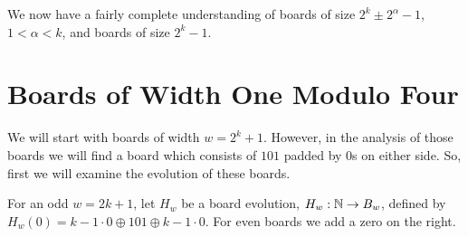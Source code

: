 \documentclass[12pt,letterpaper]{article}
\begin{document}
We now have a fairly complete understanding of boards of size $2^k\pm 2^\alpha-1$, $1<\alpha<k$, and boards of size $2^k-1$. 



\begin{comment}
\begin{proof}
  Suppose there is a gap in the center, the board on an even step is of the form $A\oplus 1\oplus 0\cdot c \oplus 1\oplus A$, where $c\equiv 3\mod 4$, and $c>3$. This last condition is so that it is a true gap, otherwise it is the smallest possible space between living columns, so it would not make sense to call it a gap. We require that there are 1s on either side of the gap, otherwise we could examine a larger gap.
  Furthermore, suppose that $A$ is not all zeros.
  
  Then suppose that after two steps, we have a board with exactly 2 living columns, $a\cdot 0 \oplus 1\oplus c-4\cdot 0\oplus 1\oplus a\cdot 0$. Then consider what the $A$ must have been.
\end{comment}

\section{Boards of Width One Modulo Four}

We will start with boards of width $w=2^k+1$. However, in the analysis of those boards we will find a board which consists of $101$ padded by 0s on either side. So, first we will examine the evolution of these boards.
\begin{dfn}\label{101Boards}
  For an odd $w=2k+1$, let $H_w$ be a board evolution, $H_w:\mathbb{N}\rightarrow B_w$, defined by $H_w(0) = k-1\cdot 0 \oplus 101 \oplus k-1\cdot 0$. For even boards we add a zero on the right.
\end{dfn}
\end{document}
